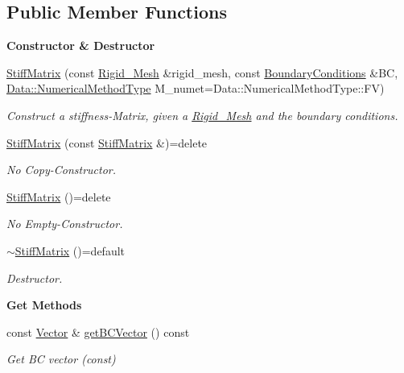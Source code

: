 \subsection*{Public Member Functions}
\begin{Indent}{\bf Constructor \& Destructor}\par
\begin{DoxyCompactItemize}
\item 
\hyperlink{classFVCode3D_1_1StiffMatrix_aba636292e7e7d5029bbc7351b21f77a1}{Stiff\+Matrix} (const \hyperlink{classFVCode3D_1_1Rigid__Mesh}{Rigid\+\_\+\+Mesh} \&rigid\+\_\+mesh, const \hyperlink{classFVCode3D_1_1BoundaryConditions}{Boundary\+Conditions} \&BC, \hyperlink{classFVCode3D_1_1Data_a5222e1901276af4586befd821445c6cf}{Data\+::\+Numerical\+Method\+Type} M\+\_\+numet=Data\+::\+Numerical\+Method\+Type\+::\+FV)
\begin{DoxyCompactList}\small\item\em Construct a stiffness-\/\+Matrix, given a \hyperlink{classFVCode3D_1_1Rigid__Mesh}{Rigid\+\_\+\+Mesh} and the boundary conditions. \end{DoxyCompactList}\item 
\hyperlink{classFVCode3D_1_1StiffMatrix_a5c7ab40cd8a216b46b78e82d41f49abd}{Stiff\+Matrix} (const \hyperlink{classFVCode3D_1_1StiffMatrix}{Stiff\+Matrix} \&)=delete
\begin{DoxyCompactList}\small\item\em No Copy-\/\+Constructor. \end{DoxyCompactList}\item 
\hyperlink{classFVCode3D_1_1StiffMatrix_aad4ccd6db291c1be634cbd82ef26bb14}{Stiff\+Matrix} ()=delete
\begin{DoxyCompactList}\small\item\em No Empty-\/\+Constructor. \end{DoxyCompactList}\item 
\hyperlink{classFVCode3D_1_1StiffMatrix_a6917ad6845a7cb32b36024dc0de1572f}{$\sim$\+Stiff\+Matrix} ()=default
\begin{DoxyCompactList}\small\item\em Destructor. \end{DoxyCompactList}\end{DoxyCompactItemize}
\end{Indent}
\begin{Indent}{\bf Get Methods}\par
\begin{DoxyCompactItemize}
\item 
const \hyperlink{namespaceFVCode3D_a16ccf345652402bccd1a5d2e6782526c}{Vector} \& \hyperlink{classFVCode3D_1_1StiffMatrix_a6cb858d3e2c0196e1884deddde864343}{get\+B\+C\+Vector} () const 
\begin{DoxyCompactList}\small\item\em Get BC vector (const) \end{DoxyCompactList}\end{DoxyCompactItemize}
\end{Indent}
